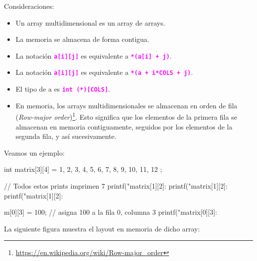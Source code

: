 \documentclass[]{scrartcl}
\newcommand{\hl}[1]{\textcolor{magenta}{\textbf{\texttt{#1}}}}
\begin{document}
Consideraciones:
\begin{itemize}
  \item Un array multidimensional es un array de arrays.
  \item La memoria se almacena de forma contigua.
  \item La notación \hl{a[i][j]} es equivalente a \hl{*(a[i] + j)}.
  \item La notación \hl{a[i][j]} es equivalente a \hl{*(a + i*COLS + j)}.
  \item El tipo de a es \hl{int (*)[COLS]}.
  \item En memoria, los arrays multidimensionales se almacenan en orden de fila (\textit{Row-major order})\footnote{\url{https://en.wikipedia.org/wiki/Row-major_order}}. Esto significa que los elementos de la primera fila se almacenan en memoria contiguamente, seguidos por los elementos de la segunda fila, y así sucesivamente.
\end{itemize}

Veamos un ejemplo:

\begin{cbox}[]{}
  int matrix[3][4] = {
    {1, 2, 3, 4},
    {5, 6, 7, 8},
    {9, 10, 11, 12}
  };

  // Todos estos prints imprimen 7
  printf("matrix[1][2]: %
  printf("matrix[1][2]: %
  printf("matrix[1][2]: %

  m[0][3] = 100; // asigna 100 a la fila 0, columna 3
  printf("matrix[0][3]: %
\end{cbox}  

La siguiente figura muestra el layout en memoria de dicho array:

\begin{center}
  \noindent {}
  \label{fig:matrix}
\end{center}
\end{document}
